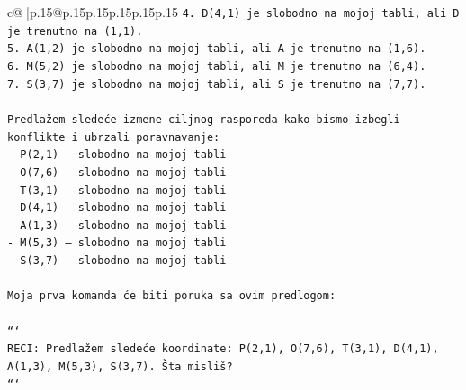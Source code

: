 \documentclass{article}
\begin{document}
{\begin{supertabular}{c@{$\;$}|p{.15\linewidth}@{}p{.15\linewidth}p{.15\linewidth}p{.15\linewidth}p{.15\linewidth}p{.15\linewidth}}
{{{\texttt{4. D(4,1) je slobodno na mojoj tabli, ali D je trenutno na (1,1).} \\
\texttt{5. A(1,2) je slobodno na mojoj tabli, ali A je trenutno na (1,6).} \\
\texttt{6. M(5,2) je slobodno na mojoj tabli, ali M je trenutno na (6,4).} \\
\texttt{7. S(3,7) je slobodno na mojoj tabli, ali S je trenutno na (7,7).} \\
\\ 
\texttt{Predlažem sledeće izmene ciljnog rasporeda kako bismo izbegli konflikte i ubrzali poravnavanje:} \\
\texttt{{-} P(2,1) – slobodno na mojoj tabli} \\
\texttt{{-} O(7,6) – slobodno na mojoj tabli} \\
\texttt{{-} T(3,1) – slobodno na mojoj tabli} \\
\texttt{{-} D(4,1) – slobodno na mojoj tabli} \\
\texttt{{-} A(1,3) – slobodno na mojoj tabli} \\
\texttt{{-} M(5,3) – slobodno na mojoj tabli} \\
\texttt{{-} S(3,7) – slobodno na mojoj tabli} \\
\\ 
\texttt{Moja prva komanda će biti poruka sa ovim predlogom:} \\
\\ 
\texttt{```} \\
\texttt{RECI: Predlažem sledeće koordinate: P(2,1), O(7,6), T(3,1), D(4,1), A(1,3), M(5,3), S(3,7). Šta misliš?} \\
\texttt{```} \\
            }
        }
    }
     \\ \\


\end{supertabular}}
\end{document}
